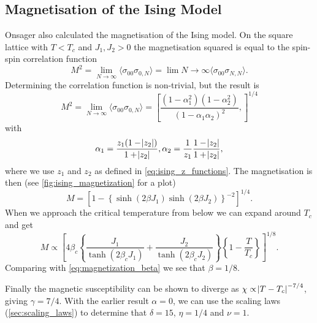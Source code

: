 \documentclass[11pt, a4paper]{report} %
\begin{document}
\subsection{Magnetisation of the Ising Model}\label{sec:ising_magnetization}

Onsager also calculated the magnetisation of the Ising model.
On the square lattice with \(T < T_c\) and \(J_1, J_2 > 0\) the magnetisation squared is equal to the spin-spin correlation function
\begin{equation}
	M^2 = \lim_{N \to \infty} \langle \sigma_{00} \sigma_{0,N} \rangle = \lim{N \to \infty} \langle \sigma_{00} \sigma_{N, N} \rangle.
\end{equation}
Determining the correlation function is non-trivial, but the result is
\begin{equation}
	M^2 = \lim_{N \to \infty} \langle \sigma_{00} \sigma_{0,N} \rangle = \left[ \frac{(1-\alpha_1^2)(1-\alpha_2^2)}{(1-\alpha_1 \alpha_2)^2}, \right]^{1/4}
\end{equation}
with
\begin{equation}
	\alpha_1 = \frac{z_1(1-\abs{z_2})}{1+\abs{z_2}}, \alpha_2 = \frac{1}{z_1}\frac{1-\abs{z_2}}{1+\abs{z_2}},
\end{equation}
where we use \(z_1\) and \(z_2\) as defined in \cref{eq:ising_z_functions}.
The magnetisation is then (see \cref{fig:ising_magnetization} for a plot)
\begin{equation}
	M = \left[1 - \left\{\sinh(2\beta J_1)\sinh(2 \beta J_2)\right\}^{-2} \right]^{1/4}.
\end{equation}
When we approach the critical temperature from below we can expand around \(T_c\) and get
\begin{equation}
	M \propto \left[4\beta_c\left\{\frac{J_1}{\tanh(2\beta_c J_1)} + \frac{J_2}{\tanh(2\beta_c J_2)}\right\} \left\{1-\frac{T}{T_c}\right\}\right]^{1/8}.
\end{equation}
Comparing with \cref{eq:magnetization_beta} we see that \(\beta = 1/8\).\cite{wu:1982}

Finally the magnetic susceptibility can be shown to diverge as \(\chi \propto \abs{T - T_c}^{-7/4}\), giving \(\gamma = 7/4\).
With the earlier result \(\alpha=0\), we can use the scaling laws (\cref{sec:scaling_laws}) to determine that \(\delta = 15\), \(\eta = 1/4\) and \(\nu = 1\).\cite{binney:1992}
\end{document}
